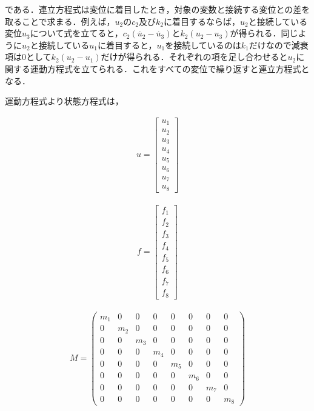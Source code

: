 である．連立方程式は変位に着目したとき，対象の変数と接続する変位との差を取ることで求まる．例えば，$u_2$の$c_2$及び$k_2$に着目するならば，$u_2$と接続している変位$u_3$について式を立てると，$c_2(\dot{u_2} - \dot{u_3})$と$k_2(u_2 - u_3)$が得られる．同じように$u_2$と接続している$u_1$に着目すると，$u_1$を接続しているのは$k_1$だけなので減衰項は$0$として$k_2(u_2 - u_1)$だけが得られる．それぞれの項を足し合わせると$u_2$に関する運動方程式を立てられる．これをすべての変位で繰り返すと連立方程式となる．

運動方程式より状態方程式は，

\begin{eqnarray}
    u = 
    \begin{bmatrix}
        u_1 \\
        u_2 \\
        u_3 \\
        u_4 \\
        u_5 \\
        u_6 \\
        u_7 \\
        u_8
    \end{bmatrix}
\end{eqnarray}

\begin{eqnarray}
    f = 
    \begin{bmatrix}
        f_1 \\
        f_2 \\
        f_3 \\
        f_4 \\
        f_5 \\
        f_6 \\
        f_7 \\
        f_8
    \end{bmatrix}
\end{eqnarray}

\begin{eqnarray}
    M = 
    \left(\begin{matrix}
        m_1 & 0   & 0   & 0   & 0   & 0   & 0   & 0   \\
        0   & m_2 & 0   & 0   & 0   & 0   & 0   & 0   \\
        0   & 0   & m_3 & 0   & 0   & 0   & 0   & 0   \\
        0   & 0   & 0   & m_4 & 0   & 0   & 0   & 0   \\
        0   & 0   & 0   & 0   & m_5 & 0   & 0   & 0   \\
        0   & 0   & 0   & 0   & 0   & m_6 & 0   & 0   \\
        0   & 0   & 0   & 0   & 0   & 0   & m_7 & 0   \\
        0   & 0   & 0   & 0   & 0   & 0   & 0   & m_8  
    \end{matrix}\right)
\end{eqnarray}

